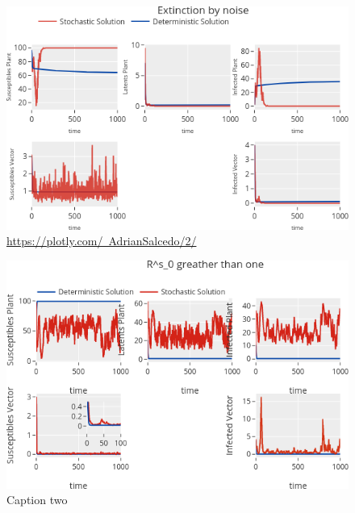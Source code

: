 
\begin{figure}[h]
\centering
\includegraphics[scale=0.6, keepaspectratio]{Figures/Extinction_Figure/ExtinctionByNoise.png}
\caption{\href{https://plotly.com/~AdrianSalcedo/2/}{https://plotly.com/~AdrianSalcedo/2/}}
\label{fig:ExtinctionByNoise}
\end{figure}
\begin{figure}[h]
\centering
\includegraphics[scale=0.6, keepaspectratio]{Figures/R0_more/R^s_0greather_than_one.png}
\caption{Caption two}
\label{fig:Rs0GreatherThanOne}
\end{figure}
\newpage
